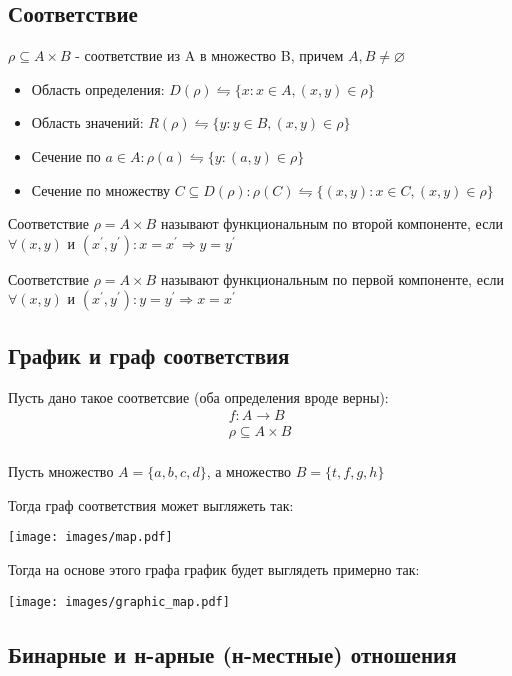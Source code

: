 \documentclass{report}
\begin{document}
\subsection{Соответствие}
$\rho \subseteq A \times B$ - соответствие из A в множество B, причем $A,B \neq \varnothing$


\begin{itemize}
	\item Область определения: $D(\rho) \leftrightharpoons \{x:x \in A, (x,y) \in \rho\}$
	\item Область значений: $R(\rho) \leftrightharpoons \{y:y \in B, (x,y) \in \rho\}$
	\item Сечение по $a \in A: \rho(a) \leftrightharpoons \{y: (a,y) \in \rho\}$
	\item Сечение по множеству $C \subseteq D(\rho): \rho(C) \leftrightharpoons \{(x,y):x \in C, (x,y) \in \rho\}$
\end{itemize}

Соответствие $\rho = A \times B$ называют функциональным по второй компоненте,
если $\forall (x,y)$ и $(x^\prime, y^\prime): x = x^\prime \Rightarrow y = y^\prime$

\medskip

Соответствие $\rho = A \times B$ называют функциональным по первой компоненте,
если $\forall (x,y)$ и $(x^\prime, y^\prime): y = y^\prime \Rightarrow x = x^\prime$

\subsection{График и граф соответствия}
Пусть дано такое соответсвие (оба определения вроде верны):
\[
\begin{align*}
		f: A \to B \\
		\rho \subseteq A \times B \\
	\end{align*}
\]

Пусть множество $A = \{a, b, c, d\}$, а множество $B = \{t,f,g,h\} $

Тогда граф соответствия может выгляжеть так:

\texttt{[image: images/map.pdf]}

\newpage

Тогда на основе этого графа график будет выглядеть примерно так:

\texttt{[image: images/graphic\_map.pdf]}


\subsection{Бинарные и н-арные (н-местные) отношения}
\end{document}
